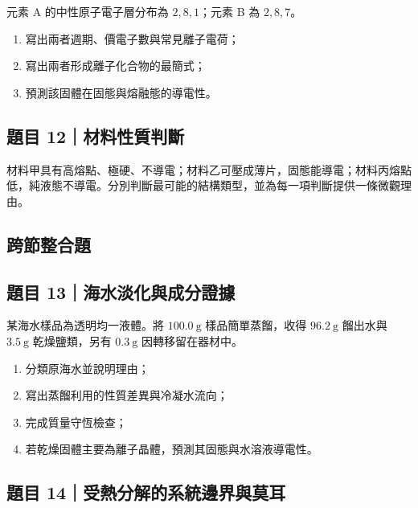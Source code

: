 \documentclass[11pt,a4paper]{article}
\providecommand{\tightlist}{%
  \setlength{\itemsep}{0pt}\setlength{\parskip}{0pt}}
\begin{document}
元素 A 的中性原子電子層分布為 \(2,8,1\)；元素 B 為 \(2,8,7\)。

\begin{enumerate}
\def\labelenumi{\arabic{enumi}.}
\tightlist
\item
  寫出兩者週期、價電子數與常見離子電荷；
\item
  寫出兩者形成離子化合物的最簡式；
\item
  預測該固體在固態與熔融態的導電性。
\end{enumerate}

\subsection{題目 12｜材料性質判斷}\label{ux984cux76ee-12ux6750ux6599ux6027ux8ceaux5224ux65b7}

材料甲具有高熔點、極硬、不導電；材料乙可壓成薄片，固態能導電；材料丙熔點低，純液態不導電。分別判斷最可能的結構類型，並為每一項判斷提供一條微觀理由。

\subsection{跨節整合題}\label{ux8de8ux7bc0ux6574ux5408ux984c}

\subsection{題目 13｜海水淡化與成分證據}\label{ux984cux76ee-13ux6d77ux6c34ux6de1ux5316ux8207ux6210ux5206ux8b49ux64da}

某海水樣品為透明均一液體。將 \(100.0\ \mathrm g\) 樣品簡單蒸餾，收得 \(96.2\ \mathrm g\) 餾出水與 \(3.5\ \mathrm g\) 乾燥鹽類，另有 \(0.3\ \mathrm g\) 因轉移留在器材中。

\begin{enumerate}
\def\labelenumi{\arabic{enumi}.}
\tightlist
\item
  分類原海水並說明理由；
\item
  寫出蒸餾利用的性質差異與冷凝水流向；
\item
  完成質量守恆檢查；
\item
  若乾燥固體主要為離子晶體，預測其固態與水溶液導電性。
\end{enumerate}

\subsection{題目 14｜受熱分解的系統邊界與莫耳}\label{ux984cux76ee-14ux53d7ux71b1ux5206ux89e3ux7684ux7cfbux7d71ux908aux754cux8207ux83abux8033}
\end{document}
